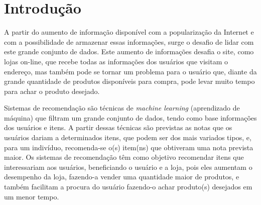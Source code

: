\documentclass[12pt,a4paper,header]{abnt}
\begin{document}
% 
% 
% 
% 
% 
% 
% 
% 
% 
% 


\tableofcontents{}
\listoffigures
\listoftables



\chapter{Introdução} \label{cap:introducao}

A partir do aumento de informação disponível com a popularização da Internet e com a possibilidade de armazenar essas informações, surge o desafio de lidar com este grande conjunto de dados\cite{isinkaye2015recommendation}. Este aumento de informações desafia o site, como lojas on-line, que recebe todas as informações dos usuários que visitam o endereço, mas também pode se tornar um problema para o usuário que, diante da grande quantidade de produtos disponíveis para compra, pode levar muito tempo para achar o produto desejado\cite{mild2002collaborative}.

Sistemas de recomendação são técnicas de \textit{machine learning} (aprendizado de máquina) que filtram um grande conjunto de dados, tendo como base informações dos usuários e itens\cite{takahashi2015estudo}. A partir dessas técnicas são previstas as notas que os usuários dariam a determinados itens, que podem ser dos mais variados tipos, e, para um indivíduo, recomenda-se o(s) item(ns) que obtiveram uma nota prevista maior\cite{shapira2011recommender}. Os sistemas de recomendação têm como objetivo recomendar itens que interessariam aos usuários\cite{melville2011recommender}, beneficiando o usuário e a loja, pois eles aumentam o desempenho da loja, fazendo-a vender uma quantidade maior de produtos, e também facilitam a procura do usuário fazendo-o achar produto(s) desejados em um menor tempo\cite{isinkaye2015recommendation}. 
\end{document}
